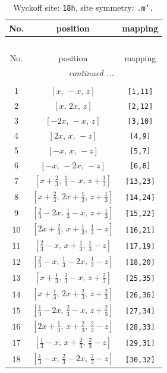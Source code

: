 \documentclass[fleqn,8pt]{jsarticle}
\begin{document}
\renewcommand{\arraystretch}{1.2}
\begin{longtable}{ccc}
\caption{Wyckoff site: {\tt 18h}, site symmetry: {\tt .m'.}}
 \\
 \hline \hline
No. & position & mapping \\ \hline \endfirsthead

\multicolumn{2}{l}{\tablename\ \thetable{}} \\
 \hline \hline
No. & position & mapping \\ \hline \endhead

 \hline \hline
\multicolumn{2}{r}{\footnotesize\it continued ...} \\ \endfoot

 \hline \hline
\multicolumn{2}{r}{} \\ \endlastfoot

1 & $\left[ x,\, - x,\, z \right]$ & {\tt [1,11]} \\ \hline
2 & $\left[ x,\, 2 x,\, z \right]$ & {\tt [2,12]} \\ \hline
3 & $\left[ - 2 x,\, - x,\, z \right]$ & {\tt [3,10]} \\ \hline
4 & $\left[ 2 x,\, x,\, - z \right]$ & {\tt [4,9]} \\ \hline
5 & $\left[ - x,\, x,\, - z \right]$ & {\tt [5,7]} \\ \hline
6 & $\left[ - x,\, - 2 x,\, - z \right]$ & {\tt [6,8]} \\ \hline
7 & $\left[ x + \frac{2}{3},\, \frac{1}{3} - x,\, z + \frac{1}{3} \right]$ & {\tt [13,23]} \\ \hline
8 & $\left[ x + \frac{2}{3},\, 2 x + \frac{1}{3},\, z + \frac{1}{3} \right]$ & {\tt [14,24]} \\ \hline
9 & $\left[ \frac{2}{3} - 2 x,\, \frac{1}{3} - x,\, z + \frac{1}{3} \right]$ & {\tt [15,22]} \\ \hline
10 & $\left[ 2 x + \frac{2}{3},\, x + \frac{1}{3},\, \frac{1}{3} - z \right]$ & {\tt [16,21]} \\ \hline
11 & $\left[ \frac{2}{3} - x,\, x + \frac{1}{3},\, \frac{1}{3} - z \right]$ & {\tt [17,19]} \\ \hline
12 & $\left[ \frac{2}{3} - x,\, \frac{1}{3} - 2 x,\, \frac{1}{3} - z \right]$ & {\tt [18,20]} \\ \hline
13 & $\left[ x + \frac{1}{3},\, \frac{2}{3} - x,\, z + \frac{2}{3} \right]$ & {\tt [25,35]} \\ \hline
14 & $\left[ x + \frac{1}{3},\, 2 x + \frac{2}{3},\, z + \frac{2}{3} \right]$ & {\tt [26,36]} \\ \hline
15 & $\left[ \frac{1}{3} - 2 x,\, \frac{2}{3} - x,\, z + \frac{2}{3} \right]$ & {\tt [27,34]} \\ \hline
16 & $\left[ 2 x + \frac{1}{3},\, x + \frac{2}{3},\, \frac{2}{3} - z \right]$ & {\tt [28,33]} \\ \hline
17 & $\left[ \frac{1}{3} - x,\, x + \frac{2}{3},\, \frac{2}{3} - z \right]$ & {\tt [29,31]} \\ \hline
18 & $\left[ \frac{1}{3} - x,\, \frac{2}{3} - 2 x,\, \frac{2}{3} - z \right]$ & {\tt [30,32]} \\
\end{longtable}
\end{document}
